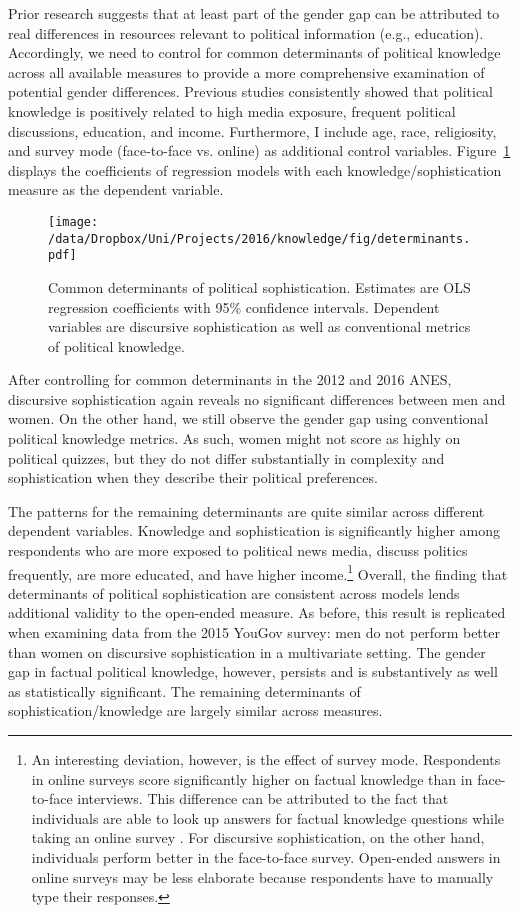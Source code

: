 Prior research suggests that at least part of the gender gap can be attributed to real differences in resources relevant to political information (e.g., education). Accordingly, we need to control for common determinants of political knowledge across all available measures to provide a more comprehensive examination of potential gender differences. Previous studies consistently showed that political knowledge is positively related to high media exposure, frequent political discussions, education, and income. Furthermore, I include age, race, religiosity, and survey mode (face-to-face vs. online) as additional control variables. Figure~\ref{fig:determinants} displays the coefficients of regression models with each knowledge/sophistication measure as the dependent variable.

\begin{figure}[h]\centering
\texttt{[image: /data/Dropbox/Uni/Projects/2016/knowledge/fig/determinants.pdf]}
\caption{Common determinants of political sophistication. Estimates are OLS regression coefficients with 95\% confidence intervals. Dependent variables are discursive sophistication as well as conventional metrics of political knowledge.
}\label{fig:determinants}
\end{figure}

After controlling for common determinants in the 2012 and 2016 ANES, discursive sophistication again reveals no significant differences between men and women. On the other hand, we still observe the gender gap using conventional political knowledge metrics. As such, women might not score as highly on political quizzes, but they do not differ substantially in complexity and sophistication when they describe their political preferences.

The patterns for the remaining determinants are quite similar across different dependent variables. Knowledge and sophistication is significantly higher among respondents who are more exposed to political news media, discuss politics frequently, are more educated, and have higher income.\footnote{An interesting deviation, however, is the effect of survey mode. Respondents in online surveys score significantly higher on factual knowledge than in face-to-face interviews. This difference can be attributed to the fact that individuals are able to look up answers for factual knowledge questions while taking an online survey \citep[c.f.,][]{clifford2016cheating}. For discursive sophistication, on the other hand, individuals perform better in the face-to-face survey. Open-ended answers in online surveys may be less elaborate because respondents have to manually type their responses.} Overall, the finding that determinants of political sophistication are consistent across models lends additional validity to the open-ended measure. As before, this result is replicated when examining data from the 2015 YouGov survey: men do not perform better than women on discursive sophistication in a multivariate setting. The gender gap in factual political knowledge, however, persists and is substantively as well as statistically significant. The remaining determinants of sophistication/knowledge are largely similar across measures.

